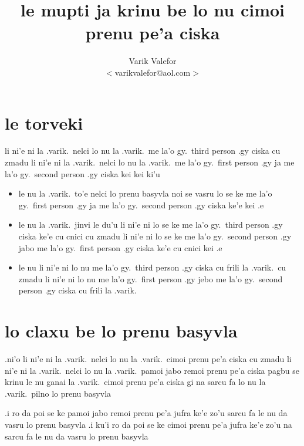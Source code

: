 \documentclass{article}
\title{le mupti ja krinu be lo nu cimoi prenu pe'a ciska}
\author{Varik Valefor\\{\small $<$varikvalefor@aol.com$>$}}
\begin{document}
\maketitle

\section{le torveki}
li ni'e ni la .varik.\ nelci lo nu la .varik.\ me la'o gy.\ third person .gy ciska cu zmadu li ni'e ni la .varik.\ nelci lo nu la .varik.\ me la'o gy.\ first person .gy ja me la'o gy.\ second person .gy ciska kei kei ki'u
\begin{itemize}
	\item le nu la .varik.\ to'e nelci lo prenu basyvla noi se vasru lo se ke me la'o gy.\ first person .gy ja me la'o gy.\ second person .gy ciska ke'e kei .e
	\item le nu la .varik.\ jinvi le du'u li ni'e ni lo se ke me la'o gy.\ third person .gy ciska ke'e cu cnici cu zmadu li ni'e ni lo se ke me la'o gy.\ second person .gy jabo me la'o gy.\ first person .gy ciska ke'e cu cnici kei .e
	\item le nu li ni'e ni lo nu me la'o gy.\ third person .gy ciska cu frili la .varik.\ cu zmadu li ni'e ni lo nu me la'o gy.\ first person .gy jebo me la'o gy.\ second person .gy ciska cu frili la .varik.
\end{itemize}

\section{lo claxu be lo prenu basyvla}
.ni'o li ni'e ni la .varik.\ nelci lo nu la .varik.\ cimoi prenu pe'a ciska cu zmadu li ni'e ni la .varik.\ nelci lo nu la .varik.\ pamoi jabo remoi prenu pe'a ciska pagbu se krinu le nu ganai la .varik.\ cimoi prenu pe'a ciska gi na sarcu fa lo nu la .varik.\ pilno lo prenu basyvla

.i ro da poi se ke pamoi jabo remoi prenu pe'a jufra ke'e zo'u sarcu fa le nu da vasru lo prenu basyvla  .i ku'i ro da poi se ke cimoi prenu pe'a jufra ke'e zo'u na sarcu fa le nu da vasru lo prenu basyvla
\end{document}
